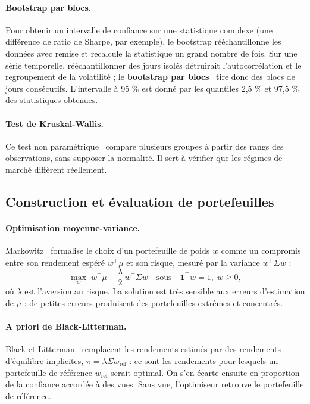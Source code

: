 \paragraph{Bootstrap par blocs.} Pour obtenir un intervalle de confiance sur une statistique complexe (une différence de ratio de Sharpe, par exemple), le bootstrap rééchantillonne les données avec remise et recalcule la statistique un grand nombre de fois. Sur une série temporelle, rééchantillonner des jours isolés détruirait l'autocorrélation et le regroupement de la volatilité ; le \textbf{bootstrap par blocs}~\cite{kunsch1989} tire donc des blocs de jours consécutifs. L'intervalle à 95 \% est donné par les quantiles 2,5 \% et 97,5 \% des statistiques obtenues.

\paragraph{Test de Kruskal-Wallis.} Ce test non paramétrique~\cite{kruskal1952} compare plusieurs groupes à partir des rangs des observations, sans supposer la normalité. Il sert à vérifier que les régimes de marché diffèrent réellement.

\subsection{Construction et évaluation de portefeuilles}

\paragraph{Optimisation moyenne-variance.} Markowitz~\cite{markowitz1952} formalise le choix d'un portefeuille de poids $w$ comme un compromis entre son rendement espéré $w^\top\mu$ et son risque, mesuré par la variance $w^\top\Sigma w$ :
\begin{equation}
  \max_w \; w^\top\mu - \frac{\lambda}{2}\, w^\top\Sigma w \quad \text{sous} \quad \mathbf{1}^\top w = 1,\; w \geq 0,
\end{equation}
où $\lambda$ est l'aversion au risque. La solution est très sensible aux erreurs d'estimation de $\mu$ : de petites erreurs produisent des portefeuilles extrêmes et concentrés.

\paragraph{A priori de Black-Litterman.} Black et Litterman~\cite{black1992} remplacent les rendements estimés par des rendements \og d'équilibre \fg{} implicites, $\pi = \lambda\Sigma w_{\text{ref}}$ : ce sont les rendements pour lesquels un portefeuille de référence $w_{\text{ref}}$ serait optimal. On s'en écarte ensuite en proportion de la confiance accordée à des vues. Sans vue, l'optimiseur retrouve le portefeuille de référence.

